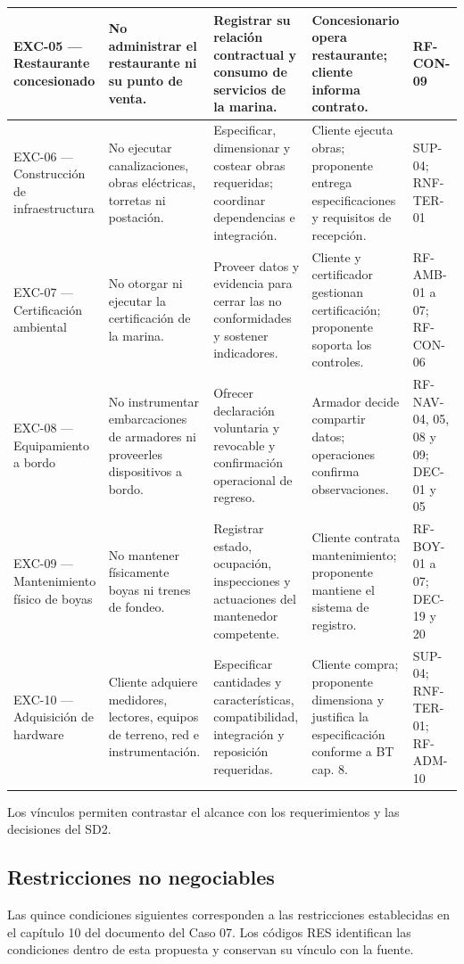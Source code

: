\begin{longtable}{|L{0.124498\AnchoTablaAnexo}|L{0.204819\AnchoTablaAnexo}|L{0.261044\AnchoTablaAnexo}|L{0.281124\AnchoTablaAnexo}|L{0.128515\AnchoTablaAnexo}|}
EXC-05 — Restaurante concesionado & No administrar el restaurante ni su punto de venta. & Registrar su relación contractual y consumo de servicios de la marina. & Concesionario opera restaurante; cliente informa contrato. & RF-CON-09 \\ \hline
EXC-06 — Construcción de infraestructura & No ejecutar canalizaciones, obras eléctricas, torretas ni postación. & Especificar, dimensionar y costear obras requeridas; coordinar dependencias e integración. & Cliente ejecuta obras; proponente entrega especificaciones y requisitos de recepción. & SUP-04; RNF-TER-01 \\ \hline
{}
EXC-07 — Certificación ambiental & No otorgar ni ejecutar la certificación de la marina. & Proveer datos y evidencia para cerrar las no conformidades y sostener indicadores. & Cliente y certificador gestionan certificación; proponente soporta los controles. & RF-AMB-01 a 07; RF-CON-06 \\ \hline
EXC-08 — Equipamiento a bordo & No instrumentar embarcaciones de armadores ni proveerles dispositivos a bordo. & Ofrecer declaración voluntaria y revocable y confirmación operacional de regreso. & Armador decide compartir datos; operaciones confirma observaciones. & RF-NAV-04, 05, 08 y 09; DEC-01 y 05 \\ \hline
{}
EXC-09 — Mantenimiento físico de boyas & No mantener físicamente boyas ni trenes de fondeo. & Registrar estado, ocupación, inspecciones y actuaciones del mantenedor competente. & Cliente contrata mantenimiento; proponente mantiene el sistema de registro. & RF-BOY-01 a 07; DEC-19 y 20 \\ \hline
EXC-10 — Adquisición de hardware & Cliente adquiere medidores, lectores, equipos de terreno, red e instrumentación. & Especificar cantidades y características, compatibilidad, integración y reposición requeridas. & Cliente compra; proponente dimensiona y justifica la especificación conforme a BT cap. 8. & SUP-04; RNF-TER-01; RF-ADM-10 \\ \hline
\end{longtable}

Los vínculos permiten contrastar el alcance con los requerimientos y las decisiones del SD2.

\subsection*{Restricciones no negociables}
Las quince condiciones siguientes corresponden a las restricciones establecidas en el capítulo 10 del documento del Caso 07. Los códigos RES identifican las condiciones dentro de esta propuesta y conservan su vínculo con la fuente.

